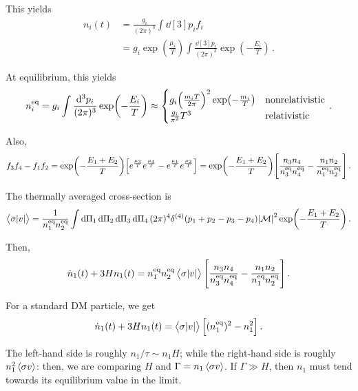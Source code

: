 \documentclass[main.tex]{subfiles}
\begin{document}
This yields 
%
\begin{align}
n_i (t) &= \frac{g_i}{(2 \pi )^3} \int \dd[3]{p_i} f_i  \\
&= g_i \exp( \frac{\mu_i}{T}) \int \frac{ \dd[3]{p_i}}{(2 \pi )^3} 
\exp(- \frac{E_i}{T})
\,.
\end{align}

At equilibrium, this yields 
%
\begin{align}
n^{\text{eq}}_i = 
g_i \int \frac{ \dd[3]{p_i}}{(2 \pi )^3} 
\exp(- \frac{E_i}{T}) \approx \begin{cases}
    g_i \qty(\frac{m_i T}{2 \pi })^{2} \exp(- \frac{m_i}{T}) & \text{nonrelativistic}  \\
    \frac{g_i}{\pi^2} T^3 & \text{relativistic}
\end{cases}
\,.
\end{align}

Also, 
%
\begin{align}
f_3 f_4 - f_1 f_2 = \exp(- \frac{E_1 + E_2 }{T}) 
\qty[ e^{ \frac{\mu_3}{T}} e^{ \frac{\mu_4}{T}} - e^{ \frac{\mu_1}{T}} e^{ \frac{\mu_2}{T}} ] 
= \exp(- \frac{E_1 + E_2 }{T}) \qty[
    \frac{n_3 n_4 }{n_3^{\text{eq}} n_4^{\text{eq}}} -
    \frac{n_1 n_2 }{n_1^{\text{eq}} n_2^{\text{eq}}}
]
\,.
\end{align}

The thermally averaged cross-section is 
%
\begin{align}
\expval{\sigma \abs{v}} = 
\frac{1}{n_1^{\text{eq}} n_2^{\text{eq}}}
\int \dd{\Pi_1 }\dd{\Pi_2}\dd{\Pi_3 }\dd{\Pi_4 }
(2 \pi )^{4} \delta^{(4)} (p_1 + p_2 - p_3 - p_4 )
\abs{\mathcal{M}}^2 \exp(- \frac{E_1 + E_2 }{T})
\,.
\end{align}

Then, 
%
\begin{align}
\dot{n}_1(t) + 3 H n_1 (t) = n_1^{\text{eq}} n_2^{\text{eq}}
\expval{\sigma \abs{v}}
\qty[
    \frac{n_3 n_4 }{n_3^{\text{eq}} n_4^{\text{eq}}} -
    \frac{n_1 n_2 }{n_1^{\text{eq}} n_2^{\text{eq}}}
]
\,.
\end{align}

For a standard DM particle, we get 
%
\begin{align}
\dot{n}_1 (t) + 3 H n_1 (t) = \expval{\sigma \abs{v}} \qty[ (n_1^{\text{eq}})^2 - n_1^2]
\,.
\end{align}

The left-hand side is roughly \(n_1 / \tau \sim n_1 H\); while the right-hand side is roughly \(n_1^2 \expval{\sigma v}\): then, we are comparing \(H\) and \(\Gamma = n_1 \expval{\sigma v}\). 
If \(\Gamma \gg H\), then \(n_1 \) must tend towards its equilibrium value in the limit. 
\end{document}
